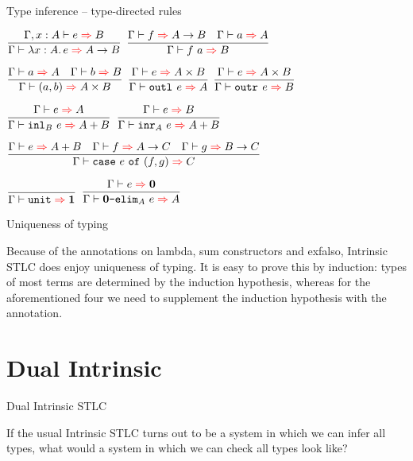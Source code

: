 \documentclass{beamer}
\begin{document}
\begin{frame}{Type inference -- type-directed rules}

\begin{center}
  $\infrule{\infer[\extend{\Gamma}{x}{A}]{e}{B}}{\infer{\fun{x}[A]{e}}{\Fun{A}{B}}}$ \quad
  $\infrule{\infer{f}{\Fun{A}{B}} \quad \infer{a}{A}}{\infer{\app{f}{a}}{B}}$

  \vspace{2em}

  $\infrule{\infer{a}{A} \quad \infer{b}{B}}{\infer{\pair{a}{b}}{\Prod{A}{B}}}$ \quad
  $\infrule{\infer{e}{\Prod{A}{B}}}{\infer{\outl{e}}{A}}$ \quad
  $\infrule{\infer{e}{\Prod{A}{B}}}{\infer{\outr{e}}{B}}$

  \vspace{2em}

  $\infrule{\infer{e}{A}}{\infer{\inl[B]{e}}{\Sum{A}{B}}}$ \quad
  $\infrule{\infer{e}{B}}{\infer{\inr[A]{e}}{\Sum{A}{B}}}$

  \vspace{2em}

  $\infrule{\infer{e}{\Sum{A}{B}} \quad \infer{f}{\Fun{A}{C}} \quad \infer{g}{\Fun{B}{C}}}{\infer{\case{e}{f}{g}}{C}}$

  \vspace{2em}

  $\infrule{}{\infer{\unit}{\Unit}}$ \quad
  $\infrule{\infer{e}{\Empty}}{\infer{\emptyelim[A]{e}}{A}}$
\end{center}

\end{frame}

\begin{frame}{Uniqueness of typing}

Because of the annotations on lambda, sum constructors and exfalso, Intrinsic STLC does enjoy uniqueness of typing. It is easy to prove this by induction: types of most terms are determined by the induction hypothesis, whereas for the aforementioned four we need to supplement the induction hypothesis with the annotation.

\end{frame}

\section{Dual Intrinsic}


\begin{frame}{Dual Intrinsic STLC}

If the usual Intrinsic STLC turns out to be a system in which we can infer all types, what would a system in which we can check all types look like?

\end{frame}
\end{document}
